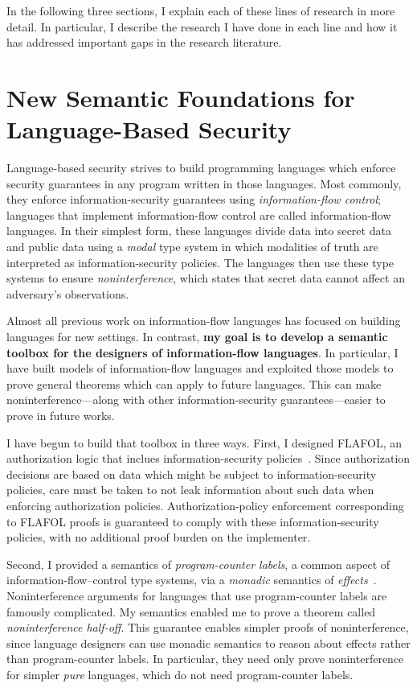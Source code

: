 \documentclass{article}
\theoremstyle{definition}
\begin{document}
In the following three sections, I explain each of these lines of research in more detail.
In particular, I describe the research I have done in each line and how it has addressed important gaps in the research literature.

\section*{New Semantic Foundations for Language-Based Security}

Language-based security strives to build programming languages which enforce security guarantees in any program written in those languages.
Most commonly, they enforce information-security guarantees using \emph{information-flow control}; languages that implement information-flow control are called information-flow languages.
In their simplest form, these languages divide data into secret data and public data using a \emph{modal} type system in which modalities of truth are interpreted as information-security policies.
The languages then use these type systems to ensure \emph{noninterference}, which states that secret data cannot affect an adversary's observations.

Almost all previous work on information-flow languages has focused on building languages for new settings.
In contrast, \textbf{my goal is to develop a semantic toolbox for the designers of information-flow languages}.
In particular, I have built models of information-flow languages and exploited those models to prove general theorems which can apply to future languages.
This can make noninterference---along with other information-security guarantees---easier to prove in future works.

I have begun to build that toolbox in three ways.
First, I designed FLAFOL, an authorization logic that inclues information-security policies~\citep{HirschACAT20}.
Since authorization decisions are based on data which might be subject to information-security policies, care must be taken to not leak information about such data when enforcing authorization policies.
Authorization-policy enforcement corresponding to FLAFOL proofs is guaranteed to comply with these information-security policies, with no additional proof burden on the implementer.

Second, I provided a semantics of \emph{program-counter labels}, a common aspect of information-flow--control type systems, via a \emph{monadic} semantics of \emph{effects}~\citep{HirschC21}.
Noninterference arguments for languages that use program-counter labels are famously complicated.
My semantics enabled me to prove a theorem called \emph{noninterference half-off}.
This guarantee enables simpler proofs of noninterference, since language designers can use monadic semantics to reason about effects rather than program-counter labels.
In particular, they need only prove noninterference for simpler \emph{pure} languages, which do not need program-counter labels.
\end{document}
